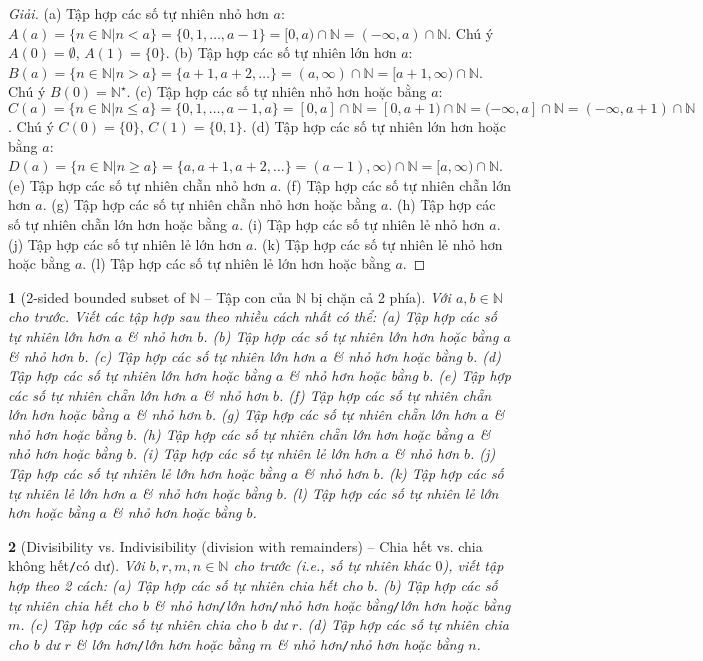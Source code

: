 \documentclass{article}
\newtheorem{baitoan}{}
\begin{document}
\begin{proof}[Giải]
	(a) Tập hợp các số tự nhiên nhỏ hơn $a$: $A(a) = \{n\in\mathbb{N}|n < a\} = \{0,1,\ldots,a - 1\} = [0,a)\cap\mathbb{N} = (-\infty,a)\cap\mathbb{N}$. Chú ý $A(0) = \emptyset$, $A(1) = \{0\}$. (b) Tập hợp các số tự nhiên lớn hơn $a$: $B(a) = \{n\in\mathbb{N}|n > a\} = \{a + 1,a + 2,\ldots\} = (a,\infty)\cap\mathbb{N} = [a + 1,\infty)\cap\mathbb{N}$. Chú ý $B(0) = \mathbb{N}^\star$. (c) Tập hợp các số tự nhiên nhỏ hơn hoặc bằng $a$: $C(a) = \{n\in\mathbb{N}|n\le a\} = \{0,1,\ldots,a - 1,a\} = [0,a]\cap\mathbb{N} = [0,a + 1)\cap\mathbb{N} = (-\infty,a]\cap\mathbb{N} = (-\infty,a + 1)\cap\mathbb{N}$. Chú ý $C(0) = \{0\}$, $C(1) = \{0,1\}$. (d) Tập hợp các số tự nhiên lớn hơn hoặc bằng $a$: $D(a) = \{n\in\mathbb{N}|n\ge a\} = \{a,a + 1,a + 2,\ldots\} = (a - 1),\infty)\cap\mathbb{N} = [a,\infty)\cap\mathbb{N}$. (e) Tập hợp các số tự nhiên chẵn nhỏ hơn $a$. (f) Tập hợp các số tự nhiên chẵn lớn hơn $a$. (g) Tập hợp các số tự nhiên chẵn nhỏ hơn hoặc bằng $a$. (h) Tập hợp các số tự nhiên chẵn lớn hơn hoặc bằng $a$. (i) Tập hợp các số tự nhiên lẻ nhỏ hơn $a$. (j) Tập hợp các số tự nhiên lẻ lớn hơn $a$. (k) Tập hợp các số tự nhiên lẻ nhỏ hơn hoặc bằng $a$. (l) Tập hợp các số tự nhiên lẻ lớn hơn hoặc bằng $a$.
\end{proof}

\begin{baitoan}[2-sided bounded subset of $\mathbb{N}$ -- Tập con của $\mathbb{N}$ bị chặn cả 2 phía]
	Với $a,b\in\mathbb{N}$ cho trước. Viết các tập hợp sau theo nhiều cách nhất có thể: (a) Tập hợp các số tự nhiên lớn hơn $a$ \& nhỏ hơn $b$. (b) Tập hợp các số tự nhiên lớn hơn hoặc bằng $a$ \& nhỏ hơn $b$. (c) Tập hợp các số tự nhiên lớn hơn $a$ \& nhỏ hơn hoặc bằng $b$. (d) Tập hợp các số tự nhiên lớn hơn hoặc bằng $a$ \& nhỏ hơn hoặc bằng $b$. (e) Tập hợp các số tự nhiên chẵn lớn hơn $a$ \& nhỏ hơn $b$. (f) Tập hợp các số tự nhiên chẵn lớn hơn hoặc bằng $a$ \& nhỏ hơn $b$. (g) Tập hợp các số tự nhiên chẵn lớn hơn $a$ \& nhỏ hơn hoặc bằng $b$. (h) Tập hợp các số tự nhiên chẵn lớn hơn hoặc bằng $a$ \& nhỏ hơn hoặc bằng $b$. (i) Tập hợp các số tự nhiên lẻ lớn hơn $a$ \& nhỏ hơn $b$. (j) Tập hợp các số tự nhiên lẻ lớn hơn hoặc bằng $a$ \& nhỏ hơn $b$. (k) Tập hợp các số tự nhiên lẻ lớn hơn $a$ \& nhỏ hơn hoặc bằng $b$. (l) Tập hợp các số tự nhiên lẻ lớn hơn hoặc bằng $a$ \& nhỏ hơn hoặc bằng $b$.
\end{baitoan}

\begin{baitoan}[Divisibility vs. Indivisibility (division with remainders) -- Chia hết vs. chia không hết{\tt/}có dư]
	Với $b,r,m,n\in\mathbb{N}$ cho trước (i.e., số tự nhiên khác $0$), viết tập hợp theo 2 cách: (a) Tập hợp các số tự nhiên chia hết cho $b$. (b) Tập hợp các số tự nhiên chia hết cho $b$ \& nhỏ hơn{\tt/}lớn hơn{\tt/}nhỏ hơn hoặc bằng{\tt/}lớn hơn hoặc bằng $m$. (c) Tập hợp các số tự nhiên chia cho $b$ dư $r$. (d) Tập hợp các số tự nhiên chia cho $b$ dư $r$ \& lớn hơn{\tt/}lớn hơn hoặc bằng $m$ \& nhỏ hơn{\tt/}nhỏ hơn hoặc bằng $n$.
\end{baitoan}
\end{document}
